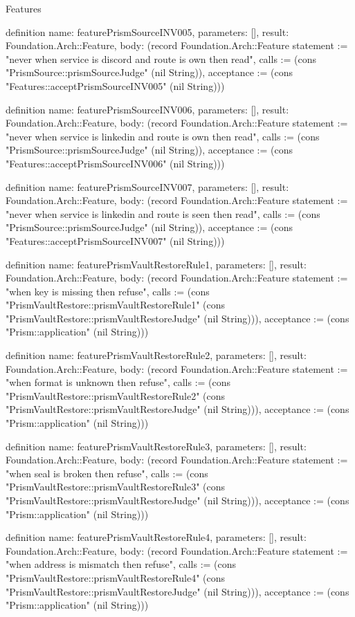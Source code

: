 \begin{lexlean}{Features}
\begin{semanticmodule}
definition{
  name: featurePrismSourceINV005,
  parameters: [],
  result: Foundation.Arch::Feature,
  body: (record Foundation.Arch::Feature {statement := "never when service is discord and route is own then read", calls := (cons "PrismSource::prismSourceJudge" (nil String)), acceptance := (cons "Features::acceptPrismSourceINV005" (nil String))})
}

definition{
  name: featurePrismSourceINV006,
  parameters: [],
  result: Foundation.Arch::Feature,
  body: (record Foundation.Arch::Feature {statement := "never when service is linkedin and route is own then read", calls := (cons "PrismSource::prismSourceJudge" (nil String)), acceptance := (cons "Features::acceptPrismSourceINV006" (nil String))})
}

definition{
  name: featurePrismSourceINV007,
  parameters: [],
  result: Foundation.Arch::Feature,
  body: (record Foundation.Arch::Feature {statement := "never when service is linkedin and route is seen then read", calls := (cons "PrismSource::prismSourceJudge" (nil String)), acceptance := (cons "Features::acceptPrismSourceINV007" (nil String))})
}

definition{
  name: featurePrismVaultRestoreRule1,
  parameters: [],
  result: Foundation.Arch::Feature,
  body: (record Foundation.Arch::Feature {statement := "when key is missing then refuse", calls := (cons "PrismVaultRestore::prismVaultRestoreRule1" (cons "PrismVaultRestore::prismVaultRestoreJudge" (nil String))), acceptance := (cons "Prism::application" (nil String))})
}

definition{
  name: featurePrismVaultRestoreRule2,
  parameters: [],
  result: Foundation.Arch::Feature,
  body: (record Foundation.Arch::Feature {statement := "when format is unknown then refuse", calls := (cons "PrismVaultRestore::prismVaultRestoreRule2" (cons "PrismVaultRestore::prismVaultRestoreJudge" (nil String))), acceptance := (cons "Prism::application" (nil String))})
}

definition{
  name: featurePrismVaultRestoreRule3,
  parameters: [],
  result: Foundation.Arch::Feature,
  body: (record Foundation.Arch::Feature {statement := "when seal is broken then refuse", calls := (cons "PrismVaultRestore::prismVaultRestoreRule3" (cons "PrismVaultRestore::prismVaultRestoreJudge" (nil String))), acceptance := (cons "Prism::application" (nil String))})
}

definition{
  name: featurePrismVaultRestoreRule4,
  parameters: [],
  result: Foundation.Arch::Feature,
  body: (record Foundation.Arch::Feature {statement := "when address is mismatch then refuse", calls := (cons "PrismVaultRestore::prismVaultRestoreRule4" (cons "PrismVaultRestore::prismVaultRestoreJudge" (nil String))), acceptance := (cons "Prism::application" (nil String))})
}


\end{semanticmodule}
\end{lexlean}
